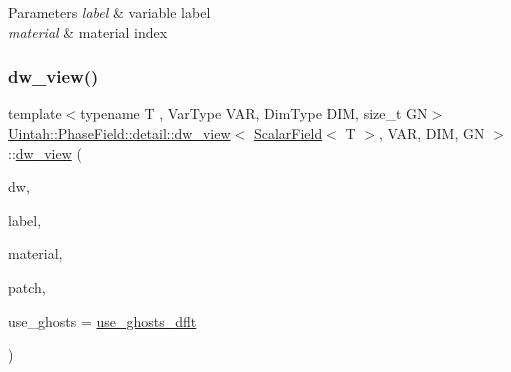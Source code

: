 \begin{DoxyParams}{Parameters}
{\em label} & variable label \\
\hline
{\em material} & material index \\
\hline
\end{DoxyParams}
\mbox{\label{classUintah_1_1PhaseField_1_1detail_1_1dw__view_3_01ScalarField_3_01T_01_4_00_01VAR_00_01DIM_00_01GN_01_4_ad680d20420eb348dd7084950fd3f52a5}} 
\subsubsection{\texorpdfstring{dw\+\_\+view()}{dw\_view()}\hspace{0.1cm}{\footnotesize\ttfamily [2/3]}}
{\footnotesize\ttfamily template$<$typename T , Var\+Type V\+AR, Dim\+Type D\+IM, size\+\_\+t GN$>$ \\
\hyperlink{classUintah_1_1PhaseField_1_1detail_1_1dw__view}{Uintah\+::\+Phase\+Field\+::detail\+::dw\+\_\+view}$<$ \hyperlink{structUintah_1_1PhaseField_1_1ScalarField}{Scalar\+Field}$<$ T $>$, V\+AR, D\+IM, GN $>$\+::\hyperlink{classUintah_1_1PhaseField_1_1detail_1_1dw__view}{dw\+\_\+view} (\begin{DoxyParamCaption}\item[{Data\+Warehouse $\ast$}]{dw,  }\item[{const typename \hyperlink{structUintah_1_1PhaseField_1_1ScalarField_a7a77875e030da64c47ce9f6c22a06959}{Field\+::label\+\_\+type} \&}]{label,  }\item[{int}]{material,  }\item[{const Patch $\ast$}]{patch,  }\item[{bool}]{use\+\_\+ghosts = {\ttfamily \hyperlink{classUintah_1_1PhaseField_1_1detail_1_1dw__view_3_01ScalarField_3_01T_01_4_00_01VAR_00_01DIM_00_01GN_01_4_a6d76ec22f8cb6a0aff18f14f846950b0}{use\+\_\+ghosts\+\_\+dflt}} }\end{DoxyParamCaption})\hspace{0.3cm}{\ttfamily [inline]}}



